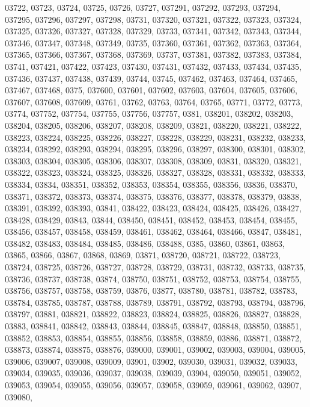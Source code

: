 {03722,
03723,
03724,
03725,
03726,
03727,
037291,
037292,
037293,
037294,
037295,
037296,
037297,
037298,
03731,
037320,
037321,
037322,
037323,
037324,
037325,
037326,
037327,
037328,
037329,
03733,
037341,
037342,
037343,
037344,
037346,
037347,
037348,
037349,
03735,
037360,
037361,
037362,
037363,
037364,
037365,
037366,
037367,
037368,
037369,
03737,
037381,
037382,
037383,
037384,
03741,
037421,
037422,
037423,
037430,
037431,
037432,
037433,
037434,
037435,
037436,
037437,
037438,
037439,
03744,
03745,
037462,
037463,
037464,
037465,
037467,
037468,
0375,
037600,
037601,
037602,
037603,
037604,
037605,
037606,
037607,
037608,
037609,
03761,
03762,
03763,
03764,
03765,
03771,
03772,
03773,
03774,
037752,
037754,
037755,
037756,
037757,
0381,
038201,
038202,
038203,
038204,
038205,
038206,
038207,
038208,
038209,
03821,
038220,
038221,
038222,
038223,
038224,
038225,
038226,
038227,
038228,
038229,
038231,
038232,
038233,
038234,
038292,
038293,
038294,
038295,
038296,
038297,
038300,
038301,
038302,
038303,
038304,
038305,
038306,
038307,
038308,
038309,
03831,
038320,
038321,
038322,
038323,
038324,
038325,
038326,
038327,
038328,
038331,
038332,
038333,
038334,
03834,
038351,
038352,
038353,
038354,
038355,
038356,
03836,
038370,
038371,
038372,
038373,
038374,
038375,
038376,
038377,
038378,
038379,
03838,
038391,
038392,
038393,
03841,
038422,
038423,
038424,
038425,
038426,
038427,
038428,
038429,
03843,
03844,
038450,
038451,
038452,
038453,
038454,
038455,
038456,
038457,
038458,
038459,
038461,
038462,
038464,
038466,
03847,
038481,
038482,
038483,
038484,
038485,
038486,
038488,
0385,
03860,
03861,
03863,
03865,
03866,
03867,
03868,
03869,
03871,
038720,
038721,
038722,
038723,
038724,
038725,
038726,
038727,
038728,
038729,
038731,
038732,
038733,
038735,
038736,
038737,
038738,
03874,
038750,
038751,
038752,
038753,
038754,
038755,
038756,
038757,
038758,
038759,
03876,
03877,
038780,
038781,
038782,
038783,
038784,
038785,
038787,
038788,
038789,
038791,
038792,
038793,
038794,
038796,
038797,
03881,
038821,
038822,
038823,
038824,
038825,
038826,
038827,
038828,
03883,
038841,
038842,
038843,
038844,
038845,
038847,
038848,
038850,
038851,
038852,
038853,
038854,
038855,
038856,
038858,
038859,
03886,
038871,
038872,
038873,
038874,
038875,
038876,
039000,
039001,
039002,
039003,
039004,
039005,
039006,
039007,
039008,
039009,
03901,
03902,
039030,
039031,
039032,
039033,
039034,
039035,
039036,
039037,
039038,
039039,
03904,
039050,
039051,
039052,
039053,
039054,
039055,
039056,
039057,
039058,
039059,
039061,
039062,
03907,
039080,
}
